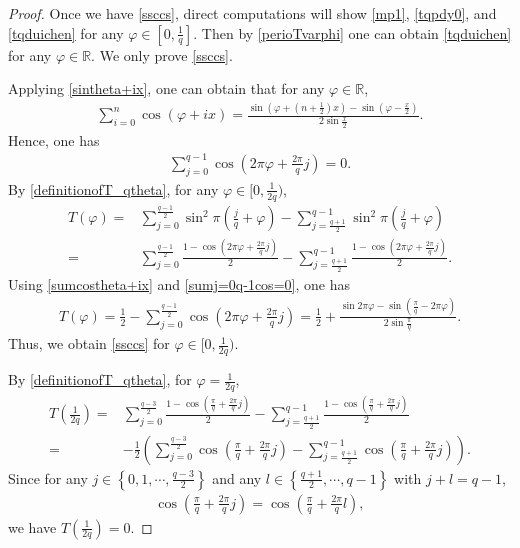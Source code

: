 \documentclass[12pt]{amsart}
\theoremstyle{plain}
\theoremstyle{definition}
\begin{document}
	\begin{proof}
		Once we have \eqref{ssccs}, direct computations will show \eqref{mp1}, \eqref{tqpdy0}, and \eqref{tqduichen} for any $\varphi\in\left[0,\frac{1}{q}\right]$. Then by \eqref{perioTvarphi} one can obtain \eqref{tqduichen} for any $\varphi\in\mathbb{R}$.
		We only prove \eqref{ssccs}.
		
		Applying \eqref{sintheta+ix}, one can obtain that for any $\varphi\in\mathbb{R}$,
		\begin{align}
			\sum_{i=0}^n\cos(\varphi+ix)=\frac{\sin\left(\varphi+\left(n+\frac{1}{2}\right)x\right)-\sin\left(\varphi-\frac{x}{2}\right)}{2\sin\frac{x}{2}}.\label{sumcostheta+ix}
		\end{align}
		Hence, one has
		\begin{align}
			\sum_{j=0}^{q-1}\cos\left(2\pi\varphi+\frac{2\pi}{q}j\right)=0.\label{sumj=0q-1cos=0}
		\end{align}
	By \eqref{definitionofT_qtheta}, for any $\varphi\in\Big[0,\frac{1}{2q}\Big)$, 
		\begin{align}
			T(\varphi)
			=&\sum_{j=0}^{\frac{q-1}{2}}\sin^2\pi\left(\frac{j}{q}+\varphi\right )-\sum_{j=\frac{q+1}{2}}^{q-1}\sin^2\pi\left(\frac{j}{q}+\varphi\right)\nonumber\\
			=&\sum_{j=0}^{\frac{q-1}{2}}\frac{1-\cos\left(2\pi\varphi+\frac{2\pi}{q}j\right)}{2}-\sum_{j=\frac{q+1}{2}}^{{q-1}}\frac{1-\cos\left(2\pi\varphi+\frac{2\pi}{q}j\right)}{2}.\nonumber
		\end{align}
Using \eqref{sumcostheta+ix} and \eqref{sumj=0q-1cos=0}, one has
\begin{align}
	T(\varphi)=\frac{1}{2}-\sum_{j=0}^{\frac{q-1}{2}}\cos\left(2\pi\varphi+\frac{2\pi}{q}j\right)=\frac{1}{2}+\frac{\sin2\pi\varphi-\sin\left(\frac{\pi}{q}-2\pi\varphi\right)}{2\sin\frac{\pi}{q}}.\nonumber
\end{align}
Thus, we obtain \eqref{ssccs} for  $\varphi\in [0,\frac{1}{2q})$.

By \eqref{definitionofT_qtheta},  for $\varphi=\frac{1}{2q}$,
\begin{align}
	T\left(\frac{1}{2q}\right)
	=&\sum_{j=0}^{\frac{q-3}{2}}\frac{1-\cos\left(\frac{\pi}{q}+\frac{2\pi}{q}j\right)}{2}-\sum_{j=\frac{q+1}{2}}^{{q-1}}\frac{1-\cos\left(\frac{\pi}{q}+\frac{2\pi}{q}j\right)}{2}\nonumber\\
	=&-\frac{1}{2}\left(\sum_{j=0}^{\frac{q-3}{2}}\cos\left(\frac{\pi}{q}+\frac{2\pi}{q}j\right)-\sum_{j=\frac{q+1}{2}}^{{q-1}}\cos\left(\frac{\pi}{q}+\frac{2\pi}{q}j\right)\right).\nonumber
\end{align}
Since for any $j\in\left\{0,1,\cdots,\frac{q-3}{2}\right\}$ and any $l\in\left\{\frac{q+1}{2},\cdots,q-1\right\}$ with $j+l=q-1$, 
\begin{align}
\cos\left(\frac{\pi}{q}+\frac{2\pi}{q}j\right)=\cos\left(\frac{\pi}{q}+\frac{2\pi}{q}l\right),\nonumber
\end{align}
we have $T\left(\frac{1}{2q}\right)=0$.


\end{proof}
\end{document}
